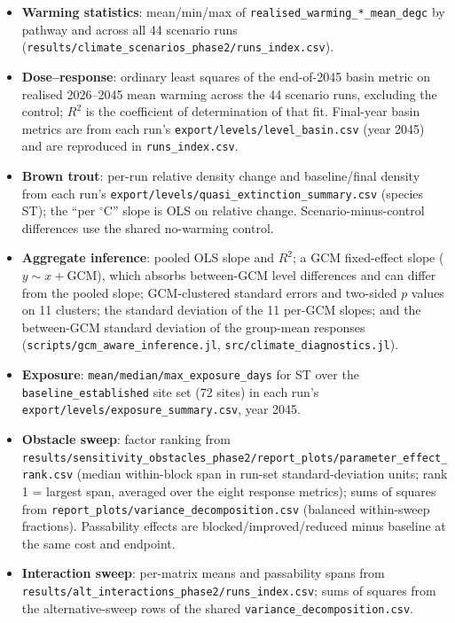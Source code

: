 \documentclass[11pt,a4paper]{article}
\begin{document}
\begin{itemize}
    \item \textbf{Warming statistics}: mean/min/max of \texttt{realised\_warming\_*\_mean\_degc} by pathway and across all 44 scenario runs (\texttt{results/climate\_scenarios\_phase2/runs\_index.csv}).
    \item \textbf{Dose--response}: ordinary least squares of the end-of-2045 basin metric on realised 2026--2045 mean warming across the 44 scenario runs, excluding the control; $R^2$ is the coefficient of determination of that fit. Final-year basin metrics are from each run's \texttt{export/levels/level\_basin.csv} (year 2045) and are reproduced in \texttt{runs\_index.csv}.
    \item \textbf{Brown trout}: per-run relative density change and baseline/final density from each run's \texttt{export/levels/quasi\_extinction\_summary.csv} (species ST); the ``per $^\circ$C'' slope is OLS on relative change. Scenario-minus-control differences use the shared no-warming control.
    \item \textbf{Aggregate inference}: pooled OLS slope and $R^2$; a GCM fixed-effect slope ($y\sim x+\text{GCM}$), which absorbs between-GCM level differences and can differ from the pooled slope; GCM-clustered standard errors and two-sided $p$ values on 11 clusters; the standard deviation of the 11 per-GCM slopes; and the between-GCM standard deviation of the group-mean responses (\texttt{scripts/gcm\_aware\_inference.jl}, \texttt{src/climate\_diagnostics.jl}).
    \item \textbf{Exposure}: \texttt{mean/median/max\_exposure\_days} for ST over the \texttt{baseline\_established} site set (72 sites) in each run's \texttt{export/levels/exposure\_summary.csv}, year 2045.
    \item \textbf{Obstacle sweep}: factor ranking from \texttt{results/sensitivity\_obstacles\_phase2/report\_plots/parameter\_effect\_rank.csv} (median within-block span in run-set standard-deviation units; rank 1 = largest span, averaged over the eight response metrics); sums of squares from \texttt{report\_plots/variance\_decomposition.csv} (balanced within-sweep fractions). Passability effects are blocked/improved/reduced minus baseline at the same cost and endpoint.
    \item \textbf{Interaction sweep}: per-matrix means and passability spans from \texttt{results/alt\_interactions\_phase2/runs\_index.csv}; sums of squares from the alternative-sweep rows of the shared \texttt{variance\_decomposition.csv}.
\end{itemize}
\end{document}
